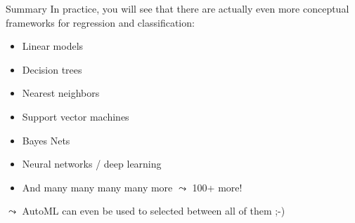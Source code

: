 \documentclass[aspectratio=169]{../latex_main/tntbeamer}  %
\begin{document}
	\begin{frame}{Summary}
	   In practice, you will see that there are actually even more conceptual frameworks for regression and classification:
	    \begin{itemize}
	        \item Linear models
	        \item Decision trees
	        \item Nearest neighbors
	        \item Support vector machines
	        \item Bayes Nets
            \item Neural networks / deep learning
	        \item And many many many many more $\leadsto$ 100+ more!
	    \end{itemize}
	    
	    \bigskip
	    
	    $\leadsto$ AutoML can even be used to selected between all of them ;-)
	\end{frame}
\end{document}
